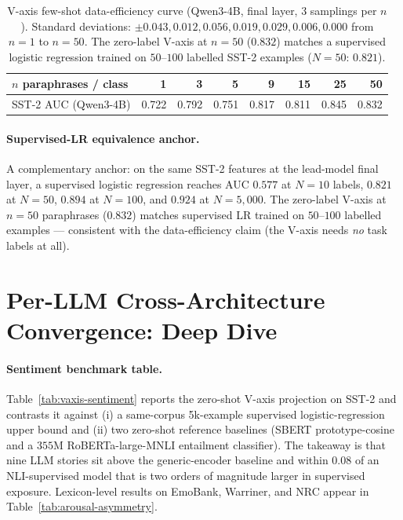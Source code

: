 \begin{table}[h]
\centering
\small
\setlength{\tabcolsep}{6pt}
\begin{tabular}{lrrrrrrr}
\toprule
$n$ paraphrases / class & 1 & 3 & 5 & 9 & 15 & 25 & 50 \\
\midrule
SST-2 AUC (Qwen3-4B)    & 0.722 & 0.792 & 0.751 & 0.817 & 0.811 & 0.845 & 0.832 \\
\bottomrule
\end{tabular}
\caption{V-axis few-shot data-efficiency curve (Qwen3-4B, final layer,
3 samplings per $n$). Standard deviations: $\pm 0.043, 0.012, 0.056,
0.019, 0.029, 0.006, 0.000$ from $n{=}1$ to $n{=}50$. The zero-label
V-axis at $n{=}50$ ($0.832$) matches a supervised logistic regression
trained on $50$--$100$ labelled SST-2 examples ($N{=}50$: $0.821$).}
\label{tab:nshot-curve}
\end{table}

\paragraph{Supervised-LR equivalence anchor.} A complementary anchor:
on the same SST-2 features at the lead-model final layer, a supervised
logistic regression reaches AUC $0.577$ at $N{=}10$ labels, $0.821$ at
$N{=}50$, $0.894$ at $N{=}100$, and $0.924$ at $N{=}5{,}000$. The
zero-label V-axis at $n{=}50$ paraphrases ($0.832$) matches supervised
LR trained on $50$--$100$ labelled examples --- consistent with the
data-efficiency claim (the V-axis needs \emph{no} task labels at all).


\section{Per-LLM Cross-Architecture Convergence: Deep Dive}
\label{app:per-llm-deep-dive}

\paragraph{Sentiment benchmark table.}
Table~\ref{tab:vaxis-sentiment} reports the zero-shot V-axis
projection on SST-2 and contrasts it
against (i) a same-corpus 5k-example supervised logistic-regression
upper bound and (ii) two zero-shot reference baselines
(SBERT prototype-cosine and a $355$M RoBERTa-large-MNLI entailment
classifier). The takeaway is that nine LLM stories sit above the
generic-encoder baseline and within $0.08$ of an NLI-supervised model
that is two orders of magnitude larger in supervised exposure.
Lexicon-level results on EmoBank, Warriner, and NRC appear in
Table~\ref{tab:arousal-asymmetry}.

